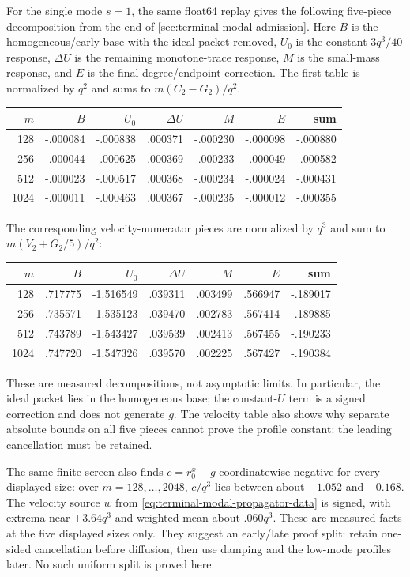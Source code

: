 For the single mode $s=1$, the same float64 replay gives the following
five-piece decomposition from the end of
\cref{sec:terminal-modal-admission}.  Here $B$ is the homogeneous/early base
with the ideal packet removed, $U_0$ is the constant-$3q^3/40$ response,
$\Delta U$ is the remaining monotone-trace response, $M$ is the small-mass
response, and $E$ is the final degree/endpoint correction.  The first table
is normalized by $q^2$ and sums to $m(C_2-G_2)/q^2$.
\begin{center}
\begin{tabular}{@{}r|rrrrrr@{}}
$m$ & $B$ & $U_0$ & $\Delta U$ & $M$ & $E$ & sum\\
\hline
128  & -.000084 & -.000838 & .000371 & -.000230 & -.000098 & -.000880\\
256  & -.000044 & -.000625 & .000369 & -.000233 & -.000049 & -.000582\\
512  & -.000023 & -.000517 & .000368 & -.000234 & -.000024 & -.000431\\
1024 & -.000011 & -.000463 & .000367 & -.000235 & -.000012 & -.000355\\
\end{tabular}
\end{center}
The corresponding velocity-numerator pieces are normalized by $q^3$ and sum
to $m(V_2+G_2/5)/q^2$:
\begin{center}
\begin{tabular}{@{}r|rrrrrr@{}}
$m$ & $B$ & $U_0$ & $\Delta U$ & $M$ & $E$ & sum\\
\hline
128  & .717775 & -1.516549 & .039311 & .003499 & .566947 & -.189017\\
256  & .735571 & -1.535123 & .039470 & .002783 & .567414 & -.189885\\
512  & .743789 & -1.543427 & .039539 & .002413 & .567455 & -.190233\\
1024 & .747720 & -1.547326 & .039570 & .002225 & .567427 & -.190384\\
\end{tabular}
\end{center}
These are measured decompositions, not asymptotic limits.  In particular,
the ideal packet lies in the homogeneous base; the constant-$U$ term is a
signed correction and does not generate $g$.  The velocity table also shows
why separate absolute bounds on all five pieces cannot prove the profile
constant: the leading cancellation must be retained.

The same finite screen also finds $c=r_0^x-g$ coordinatewise negative for
every displayed size: over $m=128,\ldots,2048$, $c/q^3$ lies between about
$-1.052$ and $-0.168$.  The velocity source $w$ from
\eqref{eq:terminal-modal-propagator-data} is signed, with extrema near
$\pm3.64q^3$ and weighted mean about $.060q^3$.  These are measured facts at
the five displayed sizes only.  They suggest an early/late proof split:
retain one-sided cancellation before diffusion, then use damping and the
low-mode profiles later.  No such uniform split is proved here.

